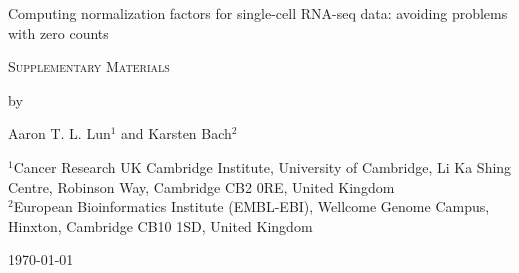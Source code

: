 \documentclass{article}
\begin{document}
\begin{titlepage}
\vspace*{3cm}
\begin{center}

{\LARGE
Computing normalization factors for single-cell RNA-seq data: avoiding problems with zero counts
\par}

\vspace{0.75cm}

{\Large 
    \textsc{Supplementary Materials}
\par
}
\vspace{0.75cm}

\large
by

\vspace{0.75cm}
Aaron T. L. Lun$^{1}$ and Karsten Bach$^{2}$

\vspace{1cm}
\begin{minipage}{0.9\textwidth}
\begin{flushleft} 
$^1$Cancer Research UK Cambridge Institute, University of Cambridge, Li Ka Shing Centre, Robinson Way, Cambridge CB2 0RE, United Kingdom \\[6pt]
$^2$European Bioinformatics Institute (EMBL-EBI), Wellcome Genome Campus, Hinxton, Cambridge CB10 1SD, United Kingdom \\[6pt]
\end{flushleft}
\end{minipage}

\vspace{1.5cm}
{\large \today{}}

\vspace*{\fill}
\end{center}
\end{titlepage}
\end{document}
